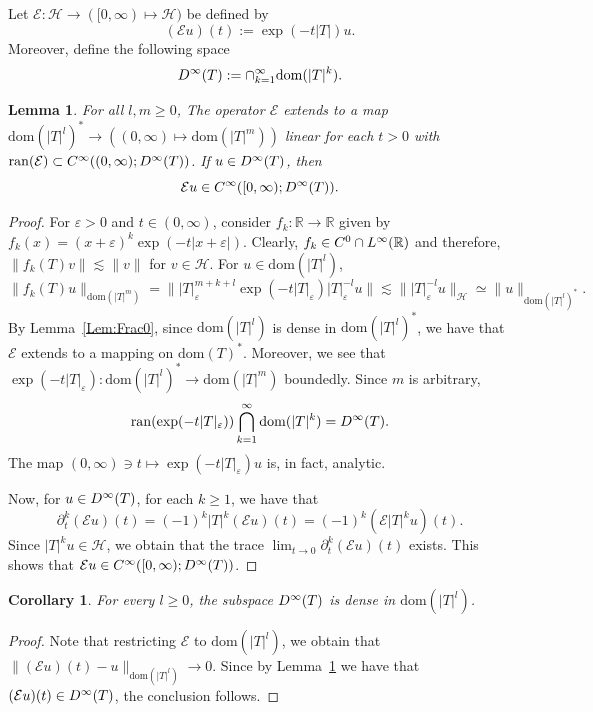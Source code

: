 \documentclass[a4paper,10pt,reqno]{amsart}
\newcommand{\R}{\mathbb{R}}
\newcommand{\modulus}[1]{|#1|}
\newcommand{\norm}[1]{\| #1 \|}%
\newcommand{\Lp}[2][{}]{{\rm L}^{#2}_{\rm #1}}%
\newcommand{\Ck}[2][{}]{{\rm C}^{#2}_{\rm #1}}%
\newcommand{\Dk}[2][{}]{{\rm D}^{#2}_{\rm #1}}%
\newcommand{\Hil}{\mathscr{H}}
\newcommand{\ran}{\mathrm{ran}}
\newcommand{\dom}{\mathrm{dom}}
\newcommand{\ext}{\mathcal{E}}
\renewcommand{\epsilon}{\varepsilon}
\newtheorem{lemma}[theorem]{Lemma}
\newtheorem{corollary}[theorem]{Corollary}
\theoremstyle{definition}
\begin{document}
Let $\ext: \Hil \to ([0, \infty) \mapsto \Hil)$ be defined by
$$ (\ext u)(t) := \exp(-t\modulus{T})u.$$
Moreover, define the following space
$$ \Dk{\infty}(T) := \cap_{k=1}^\infty \dom(\modulus{T}^k).$$

\begin{lemma}
\label{Lem:ExtReg}
For all $l,m \geq 0$, The operator $\ext$ extends to a  map $\dom(\modulus{T}^l)^\ast \to ((0,\infty)\mapsto  \dom(\modulus{T}^m))$ linear for each $t > 0$ with $\ran(\ext) \subset \Ck{\infty}((0,\infty); \Dk{\infty}(T))$.
If $u \in \Dk{\infty}(T)$, then
$$\ext u \in \Ck{\infty}([0,\infty); \Dk{\infty}(T)).$$
\end{lemma}
\begin{proof}
For $\epsilon>0$ and $t\in(0,\infty)$, consider $f_k: \R \to \R$ given by $f_k(x) = (x+\epsilon)^k \exp(-t\modulus{x + \epsilon})$.
Clearly, $f_k \in \Ck{0} \cap \Lp{\infty}(\R)$ and therefore, $\norm{f_k(T)v} \lesssim \norm{v}$ for $v \in \Hil$.
For $u \in \dom(\modulus{T}^l)$,
$$\norm{f_k(T)u}_{\dom(\modulus{T}^m)}
= \norm{\modulus{T}_{\epsilon}^{m+k+l} \exp(-t \modulus{T}_{\epsilon}) \modulus{T}_{\epsilon}^{-l}u }
\lesssim \norm{\modulus{T}_{\epsilon}^{-l} u}_{\Hil}
\simeq \norm{u}_{\dom(\modulus{T}^l)^\ast}.$$
By Lemma~\ref{Lem:Frac0}, since $\dom(\modulus{T}^l)$ is dense in $\dom(\modulus{T}^l)^\ast$, we have that $\ext$ extends to a mapping on $\dom(T)^\ast$.
Moreover, we see that  $\exp(-t\modulus{T}_{\epsilon}): \dom(\modulus{T}^l)^\ast \to \dom(\modulus{T}^{m})$ boundedly.
Since $m$ is arbitrary,
$$ \ran(\exp(-t\modulus{T}_{\epsilon})) \bigcap_{k=1}^\infty \dom(\modulus{T}^{k}) = \Dk{\infty}(T).$$
The map $(0,\infty) \ni t \mapsto \exp(-t \modulus{T}_{\epsilon})u$ is, in fact, analytic.

Now, for $u \in \Dk{\infty}(T)$, for each $k \geq 1$,  we have that
$$\partial_t^k (\ext u)(t) = (-1)^k \modulus{T}^k (\ext u)(t) = (-1)^k (\ext \modulus{T}^k u)(t).$$
Since $\modulus{T}^k u \in \Hil$, we obtain that the trace $\lim_{t\to 0}\partial_t^k (\ext u)(t)$ exists.
This shows that $\ext u \in \Ck{\infty}([0,\infty); \Dk{\infty}(T))$.
\end{proof}

\begin{corollary}
\label{Cor:DinfDensity}
For every $l \geq 0$, the subspace $\Dk{\infty}(T)$ is dense in $\dom(\modulus{T}^l)$.
\end{corollary}
\begin{proof}
Note that restricting $\ext$ to $\dom(\modulus{T}^l)$, we obtain that $ \norm{(\ext u)(t) - u}_{\dom(\modulus{T}^l)} \to 0$.
Since by Lemma~\ref{Lem:ExtReg} we have that $(\ext u)(t) \in \Dk{\infty}(T)$, the conclusion follows.
\end{proof}
\end{document}

